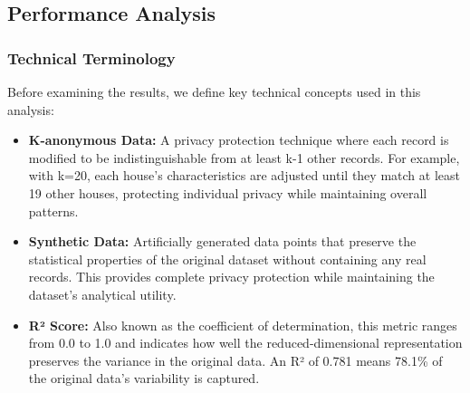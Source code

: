 \documentclass[a4paper, 11pt]{article}
\begin{document}
% 
% 
\subsection{Performance Analysis}

\subsubsection{Technical Terminology}
Before examining the results, we define key technical concepts used in this analysis:

\begin{itemize}
    \item \textbf{K-anonymous Data:} A privacy protection technique where each record is modified to be indistinguishable from at least k-1 other records. For example, with k=20, each house's characteristics are adjusted until they match at least 19 other houses, protecting individual privacy while maintaining overall patterns.
    
    \item \textbf{Synthetic Data:} Artificially generated data points that preserve the statistical properties of the original dataset without containing any real records. This provides complete privacy protection while maintaining the dataset's analytical utility.
    
    \item \textbf{R² Score:} Also known as the coefficient of determination, this metric ranges from 0.0 to 1.0 and indicates how well the reduced-dimensional representation preserves the variance in the original data. An R² of 0.781 means 78.1\% of the original data's variability is captured.
\end{itemize}
\end{document}
